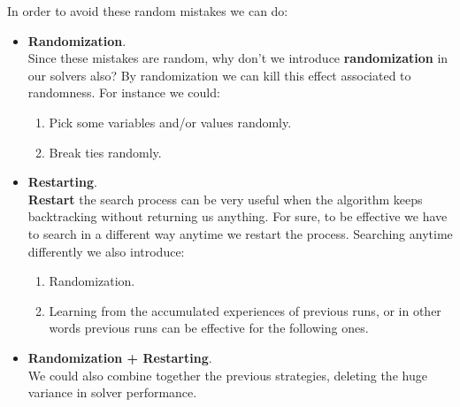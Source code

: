 In order to avoid these random mistakes we can do:
\begin{itemize}
    \renewcommand{\labelitemi}{-}
    \item \textbf{Randomization}. \\ 
    Since these mistakes are random, why don't we introduce \textbf{randomization} in our solvers also? By randomization we can kill this effect associated to 
    randomness. For instance we could: 
    \begin{enumerate}
        \item Pick some variables and/or values randomly.
        \item Break ties randomly.
    \end{enumerate}
    \item \textbf{Restarting}. \\
    \textbf{Restart} the search process can be very useful when the algorithm keeps backtracking without returning us anything. For sure, to be effective 
    we have to search in a different way anytime we restart the process. Searching anytime differently we also introduce:
    \begin{enumerate}
        \item Randomization.
        \item Learning from the accumulated experiences of previous runs, or in other words previous runs can be effective for the following ones.
    \end{enumerate}
    \item \textbf{Randomization + Restarting}. \\
    We could also combine together the previous strategies, deleting the huge variance in solver performance. 
\end{itemize}